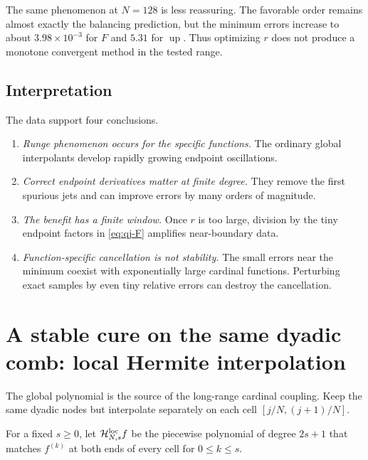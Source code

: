 \documentclass[11pt,oneside]{article}
\theoremstyle{definition}
\theoremstyle{remark}
\newcommand{\Up}{\operatorname{up}}
\begin{document}
The same phenomenon at $N=128$ is less reassuring.  The favorable order remains almost
exactly the balancing prediction, but the minimum errors increase to about
$3.98\times10^{-3}$ for $F$ and $5.31$ for $\Up$.  Thus optimizing $r$ does not produce a
monotone convergent method in the tested range.

\subsection{Interpretation}

The data support four conclusions.

\begin{enumerate}
\item \emph{Runge phenomenon occurs for the specific functions.}  The ordinary global
interpolants develop rapidly growing endpoint oscillations.
\item \emph{Correct endpoint derivatives matter at finite degree.}  They remove the first
spurious jets and can improve errors by many orders of magnitude.
\item \emph{The benefit has a finite window.}  Once $r$ is too large, division by the tiny
endpoint factors in \eqref{eq:qj-F} amplifies near-boundary data.
\item \emph{Function-specific cancellation is not stability.}  The small errors near the
minimum coexist with exponentially large cardinal functions.  Perturbing exact samples by
even tiny relative errors can destroy the cancellation.
\end{enumerate}

\section{A stable cure on the same dyadic comb: local Hermite interpolation}
\label{sec:local}

The global polynomial is the source of the long-range cardinal coupling.  Keep the same
dyadic nodes but interpolate separately on each cell $[j/N,(j+1)/N]$.

For a fixed $s\ge0$, let $\mathcal H^{\rm loc}_{N,s}f$ be the piecewise polynomial of degree
$2s+1$ that matches $f^{(k)}$ at both ends of every cell for $0\le k\le s$.
\end{document}
